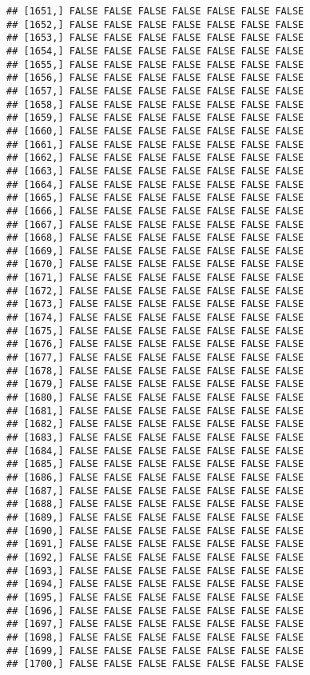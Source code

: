 \documentclass[
]{article}
\begin{document}
\begin{verbatim}
## [1651,] FALSE FALSE FALSE FALSE FALSE FALSE FALSE
## [1652,] FALSE FALSE FALSE FALSE FALSE FALSE FALSE
## [1653,] FALSE FALSE FALSE FALSE FALSE FALSE FALSE
## [1654,] FALSE FALSE FALSE FALSE FALSE FALSE FALSE
## [1655,] FALSE FALSE FALSE FALSE FALSE FALSE FALSE
## [1656,] FALSE FALSE FALSE FALSE FALSE FALSE FALSE
## [1657,] FALSE FALSE FALSE FALSE FALSE FALSE FALSE
## [1658,] FALSE FALSE FALSE FALSE FALSE FALSE FALSE
## [1659,] FALSE FALSE FALSE FALSE FALSE FALSE FALSE
## [1660,] FALSE FALSE FALSE FALSE FALSE FALSE FALSE
## [1661,] FALSE FALSE FALSE FALSE FALSE FALSE FALSE
## [1662,] FALSE FALSE FALSE FALSE FALSE FALSE FALSE
## [1663,] FALSE FALSE FALSE FALSE FALSE FALSE FALSE
## [1664,] FALSE FALSE FALSE FALSE FALSE FALSE FALSE
## [1665,] FALSE FALSE FALSE FALSE FALSE FALSE FALSE
## [1666,] FALSE FALSE FALSE FALSE FALSE FALSE FALSE
## [1667,] FALSE FALSE FALSE FALSE FALSE FALSE FALSE
## [1668,] FALSE FALSE FALSE FALSE FALSE FALSE FALSE
## [1669,] FALSE FALSE FALSE FALSE FALSE FALSE FALSE
## [1670,] FALSE FALSE FALSE FALSE FALSE FALSE FALSE
## [1671,] FALSE FALSE FALSE FALSE FALSE FALSE FALSE
## [1672,] FALSE FALSE FALSE FALSE FALSE FALSE FALSE
## [1673,] FALSE FALSE FALSE FALSE FALSE FALSE FALSE
## [1674,] FALSE FALSE FALSE FALSE FALSE FALSE FALSE
## [1675,] FALSE FALSE FALSE FALSE FALSE FALSE FALSE
## [1676,] FALSE FALSE FALSE FALSE FALSE FALSE FALSE
## [1677,] FALSE FALSE FALSE FALSE FALSE FALSE FALSE
## [1678,] FALSE FALSE FALSE FALSE FALSE FALSE FALSE
## [1679,] FALSE FALSE FALSE FALSE FALSE FALSE FALSE
## [1680,] FALSE FALSE FALSE FALSE FALSE FALSE FALSE
## [1681,] FALSE FALSE FALSE FALSE FALSE FALSE FALSE
## [1682,] FALSE FALSE FALSE FALSE FALSE FALSE FALSE
## [1683,] FALSE FALSE FALSE FALSE FALSE FALSE FALSE
## [1684,] FALSE FALSE FALSE FALSE FALSE FALSE FALSE
## [1685,] FALSE FALSE FALSE FALSE FALSE FALSE FALSE
## [1686,] FALSE FALSE FALSE FALSE FALSE FALSE FALSE
## [1687,] FALSE FALSE FALSE FALSE FALSE FALSE FALSE
## [1688,] FALSE FALSE FALSE FALSE FALSE FALSE FALSE
## [1689,] FALSE FALSE FALSE FALSE FALSE FALSE FALSE
## [1690,] FALSE FALSE FALSE FALSE FALSE FALSE FALSE
## [1691,] FALSE FALSE FALSE FALSE FALSE FALSE FALSE
## [1692,] FALSE FALSE FALSE FALSE FALSE FALSE FALSE
## [1693,] FALSE FALSE FALSE FALSE FALSE FALSE FALSE
## [1694,] FALSE FALSE FALSE FALSE FALSE FALSE FALSE
## [1695,] FALSE FALSE FALSE FALSE FALSE FALSE FALSE
## [1696,] FALSE FALSE FALSE FALSE FALSE FALSE FALSE
## [1697,] FALSE FALSE FALSE FALSE FALSE FALSE FALSE
## [1698,] FALSE FALSE FALSE FALSE FALSE FALSE FALSE
## [1699,] FALSE FALSE FALSE FALSE FALSE FALSE FALSE
## [1700,] FALSE FALSE FALSE FALSE FALSE FALSE FALSE

\end{verbatim}
\end{document}
